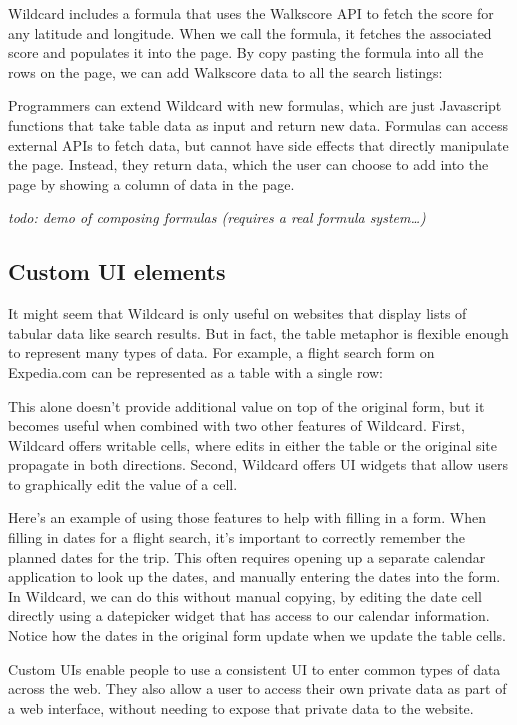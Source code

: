 \documentclass[english,submission]{programming}
\begin{document}
Wildcard includes a formula that uses the Walkscore API to fetch the
score for any latitude and longitude. When we call the formula, it
fetches the associated score and populates it into the page. By copy
pasting the formula into all the rows on the page, we can add Walkscore
data to all the search listings:

Programmers can extend Wildcard with new formulas, which are just
Javascript functions that take table data as input and return new data.
Formulas can access external APIs to fetch data, but cannot have side
effects that directly manipulate the page. Instead, they return data,
which the user can choose to add into the page by showing a column of
data in the page.

\emph{todo: demo of composing formulas (requires a real formula
system\ldots)}

\hypertarget{custom-ui-elements}{%
\subsection{Custom UI elements}\label{custom-ui-elements}}

It might seem that Wildcard is only useful on websites that display
lists of tabular data like search results. But in fact, the table
metaphor is flexible enough to represent many types of data. For
example, a flight search form on Expedia.com can be represented as a
table with a single row:

This alone doesn't provide additional value on top of the original form,
but it becomes useful when combined with two other features of Wildcard.
First, Wildcard offers writable cells, where edits in either the table
or the original site propagate in both directions. Second, Wildcard
offers UI widgets that allow users to graphically edit the value of a
cell.

Here's an example of using those features to help with filling in a
form. When filling in dates for a flight search, it's important to
correctly remember the planned dates for the trip. This often requires
opening up a separate calendar application to look up the dates, and
manually entering the dates into the form. In Wildcard, we can do this
without manual copying, by editing the date cell directly using a
datepicker widget that has access to our calendar information. Notice
how the dates in the original form update when we update the table
cells.

Custom UIs enable people to use a consistent UI to enter common types of
data across the web. They also allow a user to access their own private
data as part of a web interface, without needing to expose that private
data to the website.
\end{document}
